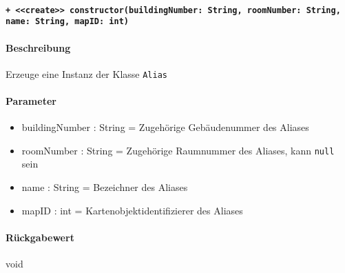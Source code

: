 \paragraph{\texttt{+ <<create>> constructor(buildingNumber: String, roomNumber: String, name: String, mapID: int)}}%
\paragraph*{Beschreibung}
Erzeuge eine Instanz der Klasse \verb#Alias#
\paragraph*{Parameter}
\begin{itemize}
    \item buildingNumber : String = Zugehörige Gebäudenummer des Aliases
    \item roomNumber : String = Zugehörige Raumnummer des Aliases, kann \verb#null# sein
    \item name : String = Bezeichner des Aliases
    \item mapID : int = Kartenobjektidentifizierer des Aliases
\end{itemize}
\paragraph*{Rückgabewert}
void